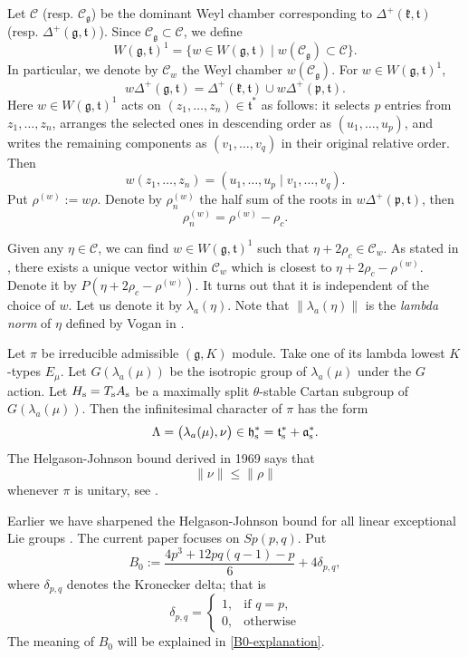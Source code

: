 \documentclass[11pt]{amsart}
\theoremstyle{plain}
\theoremstyle{definition}
\newcommand{\fra}{\mathfrak{a}}
\newcommand{\frg}{\mathfrak{g}}
\newcommand{\frh}{\mathfrak{h}}
\newcommand{\frk}{\mathfrak{k}}
\newcommand{\frp}{\mathfrak{p}}
\newcommand{\frt}{\mathfrak{t}}
\begin{document}
Let $\mathcal{C}$ (resp. $\mathcal{C}_\frg$) be the dominant Weyl chamber corresponding to $\Delta^+(\frk,\frt)$ (resp. $\Delta^+(\frg,\frt)$). Since $\mathcal{C}_\frg\subset \mathcal{C}$, we define
\[W(\frg,\frt)^1=\{w\in W(\frg,\frt)\mid w(\mathcal{C}_\frg)\subset \mathcal{C}\}.\]
In particular, we denote by $\mathcal{C}_w$ the Weyl chamber $w(\mathcal{C}_\frg)$. For $w\in W(\frg,\frt)^1$,
\[w\Delta^+(\frg,\frt)=\Delta^+(\frk,\frt)\cup w\Delta^+(\frp,\frt).\]
Here $w\in W(\frg,\frt)^1$ acts on $(z_1, \dots, z_n)\in\frt^*$ as follows: it selects $p$ entries from $z_1, \dots, z_n$, arranges the selected ones in descending order as $(u_1,\dots,u_p)$, and writes the remaining components as $(v_1,\dots,v_q)$ in their original relative order.
Then
\begin{equation}\label{wgt-1}
	w(z_1,\dots,z_n)=(u_1,\dots,u_p\mid v_1,\dots,v_q).
\end{equation}
Put $\rho^{(w)}:=w\rho$. Denote by $\rho_n^{(w)}$ the half sum of the roots in $w\Delta^+(\frp,\frt)$, then
\[\rho_n^{(w)}=\rho^{(w)}-\rho_c.\]



Given any $\eta\in\mathcal{C}$, we can find $w\in W(\frg, \frt)^1$ such that $\eta+2\rho_c\in \mathcal{C}_{w}$. As stated in \cite{SV}, there exists a unique
vector within $\mathcal{C}_{w}$ which is closest to $\eta+2\rho_c-\rho^{(w)}$. Denote it by $P(\eta+2\rho_c-\rho^{(w)})$. It turns out that it is independent of the choice of $w$. Let us denote it by $\lambda_a(\eta)$. Note that
$\|\lambda_a(\eta)\|$ is the \emph{lambda norm} of $\eta$ defined by Vogan in \cite{V81}.


Let $\pi$ be irreducible admissible $(\frg,K)$ module. Take one of its lambda lowest $K$-types $E_{\mu}$. Let $G(\lambda_a(\mu))$ be the isotropic group of $\lambda_a(\mu)$ under the $G$ action. Let $H_{\rm s}=T_{\rm s} A_{\rm s}$ be a maximally split $\theta$-stable Cartan subgroup of $G(\lambda_a(\mu))$.
Then the infinitesimal character of  $\pi$ has the form
\begin{equation}\label{inf-char}
	\Lambda=\big(\lambda_a(\mu),\nu\big)\in \frh_{\rm s}^*=\frt_{\rm s}^*+\fra_{\rm s}^*.
\end{equation}
The Helgason-Johnson bound derived in 1969 says that
$$
\|\nu\|\leq \|\rho\|
$$
whenever $\pi$ is unitary, see \cite{HJ}.


Earlier we have sharpened the Helgason-Johnson bound for all linear exceptional Lie groups \cite{D23}. The current paper focuses on $Sp(p, q)$.
Put
\begin{equation}\label{B0}
	B_0:=\dfrac{4p^3+12pq(q-1)-p}{6}+4\delta_{p,q},
\end{equation}
where $\delta_{p,q}$ denotes the Kronecker delta; that is
\[\delta_{p,q}=\left\{
\begin{array}{ll}
	1, & \text{if } q=p,\\
	0, & \text{otherwise}
\end{array}
\right.\]
The meaning of $B_0$ will be explained in \eqref{B0-explanation}.
\end{document}
